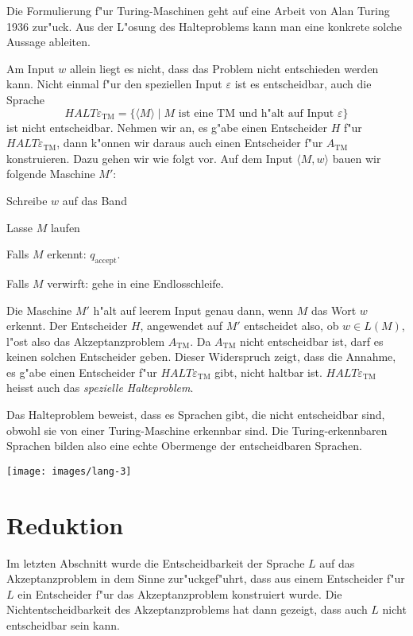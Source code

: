 Die Formulierung f"ur Turing-Maschinen geht auf eine Arbeit von
Alan Turing 1936 zur"uck.
Aus der L"osung des Halteproblems kann
man eine konkrete solche Aussage ableiten.

Am Input $w$ allein liegt es nicht, dass das Problem nicht
entschieden werden kann.
Nicht einmal f"ur den speziellen Input $\varepsilon$ ist es
entscheidbar, auch die Sprache
\[
\textit{HALT}\varepsilon_{\text{TM}}
=\{
\langle M\rangle \;|\;
\text{$M$ ist eine TM und h"alt auf Input $\varepsilon$}
\}
\]
ist nicht entscheidbar. Nehmen wir an, es g"abe einen
Entscheider $H$ f"ur $\textit{HALT}\varepsilon_{\text{TM}}$, dann k"onnen wir daraus
auch einen Entscheider f"ur $A_{\text{TM}}$ konstruieren.
Dazu gehen wir wie folgt vor. Auf dem Input $\langle M,w\rangle$
bauen wir folgende Maschine $M'$:
\medskip
\begin{compactenum}
\item Schreibe $w$ auf das Band
\item Lasse $M$ laufen
\item Falls $M$ erkennt: $q_{\text{accept}}$.
\item Falls $M$ verwirft: gehe in eine Endlosschleife.
\end{compactenum}
\medskip
Die Maschine $M'$ h"alt auf leerem Input genau dann, wenn $M$
das Wort $w$ erkennt. Der Entscheider $H$, angewendet auf $M'$
entscheidet also, ob $w\in L(M)$, l"ost also das Akzeptanzproblem
$A_{\text{TM}}$. 
Da $A_{\text{TM}}$ nicht entscheidbar ist, darf es keinen solchen
Entscheider geben. Dieser Widerspruch zeigt, dass die Annahme, es
g"abe einen Entscheider f"ur $\textit{HALT}\varepsilon_{\text{TM}}$ gibt,
nicht haltbar ist. $\textit{HALT}\varepsilon_{\text{TM}}$ heisst
auch das {\em spezielle Halteproblem}.

Das Halteproblem beweist, dass es Sprachen gibt, die nicht
entscheidbar sind, obwohl sie von einer Turing-Maschine
erkennbar sind. Die Turing-erkennbaren Sprachen bilden also eine
echte Obermenge der entscheidbaren Sprachen.
\begin{center}
\texttt{[image: images/lang-3]}
\end{center}

\section{Reduktion}
Im letzten Abschnitt wurde die Entscheidbarkeit der Sprache $L$
auf das Akzeptanzproblem in dem Sinne zur"uckgef"uhrt, dass
aus einem Entscheider f"ur $L$ ein Entscheider f"ur das Akzeptanzproblem
konstruiert wurde. Die Nichtentscheidbarkeit des Akzeptanzproblems
hat dann gezeigt, dass auch $L$ nicht entscheidbar sein kann.

